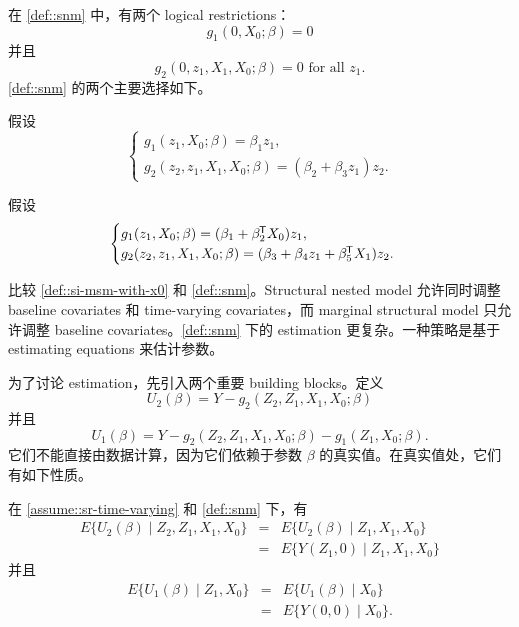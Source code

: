在 \cref{def::snm} 中，有两个 logical restrictions：
$$
g_1( 0, X_0; \beta)  = 0
$$
并且
$$
g_2(0, z_1,  X_1,  X_0; \beta) =0   \text{ for all } z_1.
$$ 
 \cref{def::snm} 的两个主要选择如下。

\begin{example}
\label{example::snm-leading1}
假设
$$
    \begin{cases}
g_1( z_1, X_0; \beta)  =  \beta_1 z_1, \\
g_2(z_2, z_1,  X_1,  X_0; \beta) =  (\beta_2 + \beta_3 z_1  ) z_2 .
    \end{cases}    
  $$
\end{example}

\begin{example}
\label{example::snm-leading2}
假设
$$
    \begin{cases}
g_1( z_1, X_0; \beta) = (\beta_1 + \beta_2^{\mkern-1.5mu\mathsf{T}} X_0) z_1, \\
g_2(z_2, z_1,  X_1,  X_0; \beta) = (\beta_3 + \beta_4 z_1  + \beta_5^{\mkern-1.5mu\mathsf{T}} X_1 ) z_2.
    \end{cases}    
    $$
\end{example}
 


比较 \cref{def::si-msm-with-x0} 和 \cref{def::snm}。Structural nested model 允许同时调整 baseline covariates 和 time-varying covariates，而 marginal structural model 只允许调整 baseline covariates。\cref{def::snm} 下的 estimation 更复杂。一种策略是基于 estimating equations 来估计参数。

为了讨论 estimation，先引入两个重要 building blocks。定义
$$
U_2(\beta) = Y- g_2(Z_2, Z_1, X_1, X_0;\beta) 
$$
并且
$$
U_1(\beta) = Y- g_2(Z_2, Z_1, X_1, X_0;\beta)  - g_1( Z_1, X_0;\beta) .
$$
它们不能直接由数据计算，因为它们依赖于参数 $\beta$ 的真实值。在真实值处，它们有如下性质。


\begin{lemma}
\label{lemma::snm-1}
在 \cref{assume::sr-time-varying} 和 \cref{def::snm} 下，有
\begin{eqnarray*}
E\{  U_2(\beta)  \mid Z_2, Z_1, X_1, X_0 \}  &=&  E\{  U_2(\beta)  \mid  Z_1, X_1, X_0 \}  \\
&=&  E\{   Y(Z_1,0) \mid  Z_1, X_1, X_0 \}
\end{eqnarray*}
 并且
 \begin{eqnarray*}
E\{  U_1(\beta)  \mid  Z_1, X_0 \}  &=&  E\{  U_1(\beta)  \mid  X_0 \}  \\
&=&  E\{   Y(0,0) \mid   X_0 \}.
\end{eqnarray*}
\end{lemma}


